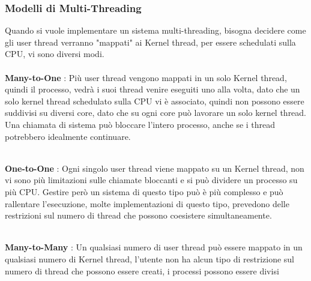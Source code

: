 \documentclass[12pt, letterpaper]{article}
\newcommand{\acc}{\\\hphantom{}\\}
\begin{document}
\subsubsection{Modelli di Multi-Threading}
Quando si vuole implementare un sistema multi-threading, bisogna decidere come gli user thread verranno 
"mappati" ai Kernel thread, per essere schedulati sulla CPU, vi sono diversi modi.\acc
\textbf{Many-to-One} : Più user thread vengono mappati in un solo Kernel thread, quindi il processo, vedrà i suoi 
thread venire eseguiti uno alla volta, dato che un solo kernel thread schedulato sulla CPU vi è associato, quindi non 
possono essere suddivisi su diversi core, dato che su ogni core può lavorare un solo kernel thread. Una chiamata di sistema 
può bloccare l'intero processo, anche se i thread potrebbero idealmente continuare.
\begin{figure}[h]
\end{figure}
\\\textbf{One-to-One} : 
Ogni singolo user thread viene mappato su un Kernel thread, non vi sono più limitazioni sulle 
chiamate bloccanti e si può dividere un processo su più CPU. Gestire però un sistema di questo tipo può 
è più complesso e può rallentare l'esecuzione, molte implementazioni di questo tipo, prevedono delle 
restrizioni sul numero di thread che possono coesistere simultaneamente.
\begin{figure}[h]
\end{figure}
\\\textbf{Many-to-Many} : 
Un qualsiasi numero di user thread può essere mappato in un qualsiasi numero di Kernel thread, l'utente non ha 
alcun tipo di restrizione sul numero di thread che possono essere creati, i processi possono essere divisi 
\end{document}
